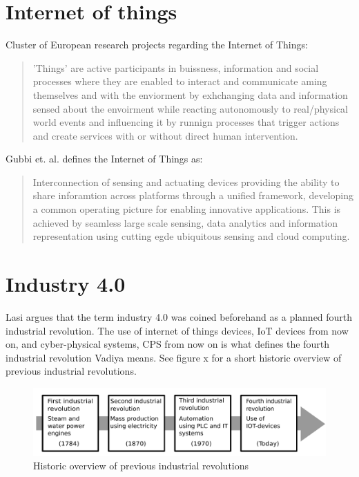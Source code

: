 \section{Internet of things}
Cluster of European research projects regarding the Internet of Things:
\begin{quote}
    'Things' are active participants in buissness, information and social processes where they are enabled to interact and communicate aming themselves and with the enviorment by exhchanging data and information sensed about the envoirment while reacting autonomously to real/physical world events and influencing it by runnign processes that trigger actions and create services with or without direct human intervention.\cite{Gubbi2013}
\end{quote} 

Gubbi et. al. defines the Internet of Things as:
\begin{quote}
    Interconnection of sensing and actuating devices providing the ability to share inforamtion across platforms through a unified framework, developing a common operating picture for enabling innovative applications. 
    This is achieved by seamless large scale sensing, data analytics and information representation using cutting egde ubiquitous sensing and cloud computing.\cite{Gubbi2013}
\end{quote}

\section{Industry 4.0}
Lasi argues that the term industry 4.0 was coined beforehand as a planned fourth industrial revolution.\cite{Lasi2014}
The use of internet of things devices, IoT devices from now on, and cyber-physical systems, CPS from now on is what defines the fourth industrial revolution Vadiya means.\cite{Vaidya2018}
See figure x for a short historic overview of previous industrial revolutions.   
\begin{figure}
    \centering
    \includegraphics[width=\textwidth]{Pictures/Industrial_revolution.pdf} 
    \caption{Historic overview of previous industrial revolutions}
    \label{Indutrial revolutions}
\end{figure}

